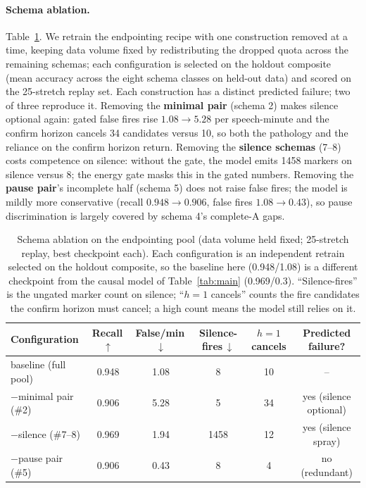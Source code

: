 \documentclass[11pt]{article}
\begin{document}
\paragraph{Schema ablation.} Table~\ref{tab:ablation}. We retrain the endpointing recipe with one construction removed at a time, keeping data volume fixed by redistributing the dropped quota across the remaining schemas; each configuration is selected on the holdout composite (mean accuracy across the eight schema classes on held-out data) and scored on the 25-stretch replay set. Each construction has a distinct predicted failure; two of three reproduce it. Removing the \textbf{minimal pair} (schema 2) makes silence optional again: gated false fires rise $1.08{\to}5.28$ per speech-minute and the confirm horizon cancels 34 candidates versus 10, so both the pathology and the reliance on the confirm horizon return. Removing the \textbf{silence schemas} (7--8) costs competence on silence: without the gate, the model emits 1458 markers on silence versus 8; the energy gate masks this in the gated numbers. Removing the \textbf{pause pair}'s incomplete half (schema 5) does not raise false fires; the model is mildly more conservative (recall $0.948{\to}0.906$, false fires $1.08{\to}0.43$), so pause discrimination is largely covered by schema 4's complete-A gaps.

\begin{table}[h]
  \centering\small
  \caption{Schema ablation on the endpointing pool (data volume held fixed; 25-stretch replay, best checkpoint each). Each configuration is an independent retrain selected on the holdout composite, so the baseline here (0.948/1.08) is a different checkpoint from the causal model of Table~\ref{tab:main} (0.969/0.3). ``Silence-fires'' is the ungated marker count on silence; ``$h{=}1$ cancels'' counts the fire candidates the confirm horizon must cancel; a high count means the model still relies on it.}
  \label{tab:ablation}
  \begin{tabular}{lccccc}
    \toprule
    Configuration & Recall\,$\uparrow$ & False/min\,$\downarrow$ & Silence-fires\,$\downarrow$ & $h{=}1$ cancels & Predicted failure? \\
    \midrule
    baseline (full pool) & 0.948 & 1.08 & 8 & 10 & -- \\
    $-$minimal pair (\#2) & 0.906 & 5.28 & 5 & 34 & yes (silence optional) \\
    $-$silence (\#7--8) & 0.969 & 1.94 & 1458 & 12 & yes (silence spray) \\
    $-$pause pair (\#5) & 0.906 & 0.43 & 8 & 4 & no (redundant) \\
    \bottomrule
  \end{tabular}
\end{table}
\end{document}
